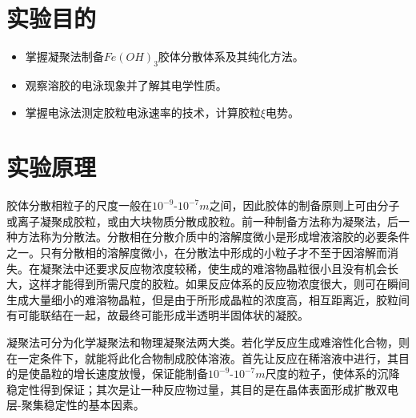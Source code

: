 \documentclass[12pt,hyperref,a4paper,UTF8]{ctexart}
\begin{document}
\cover

%
%

\thispagestyle{empty} %

\newpage
\tableofcontents

\newpage


\section{实验目的}
\begin{itemize}
    \item 掌握凝聚法制备$Fe(OH)_3$胶体分散体系及其纯化方法。
    \item 观察溶胶的电泳现象并了解其电学性质。
    \item 掌握电泳法测定胶粒电泳速率的技术，计算胶粒$\xi$电势。
\end{itemize}

\section{实验原理}
胶体分散相粒子的尺度一般在$10^{-9}$-$10^{-7}m$之间，因此胶体的制备原则上可由分子或离子凝聚成胶粒，或由大块物质分散成胶粒。前一种制备方法称为凝聚法，后一种方法称为分散法。分散相在分散介质中的溶解度微小是形成增液溶胶的必要条件之一。只有分散相的溶解度微小，在分散法中形成的小粒子才不至于因溶解而消失。在凝聚法中还要求反应物浓度较稀，使生成的难溶物晶粒很小且没有机会长大，这样才能得到所需尺度的胶粒。如果反应体系的反应物浓度很大，则可在瞬间生成大量细小的难溶物晶粒，但是由于所形成晶粒的浓度高，相互距离近，胶粒间有可能联结在一起，故最终可能形成半透明半固体状的凝胶。

凝聚法可分为化学凝聚法和物理凝聚法两大类。若化学反应生成难溶性化合物，则在一定条件下，就能将此化合物制成胶体溶液。首先让反应在稀溶液中进行，其目的是使晶粒的增长速度放慢，保证能制备$10^{-9}$-$10^{-7}m$尺度的粒子，使体系的沉降稳定性得到保证；其次是让一种反应物过量，其目的是在晶体表面形成扩散双电层-聚集稳定性的基本因素。
\end{document}
